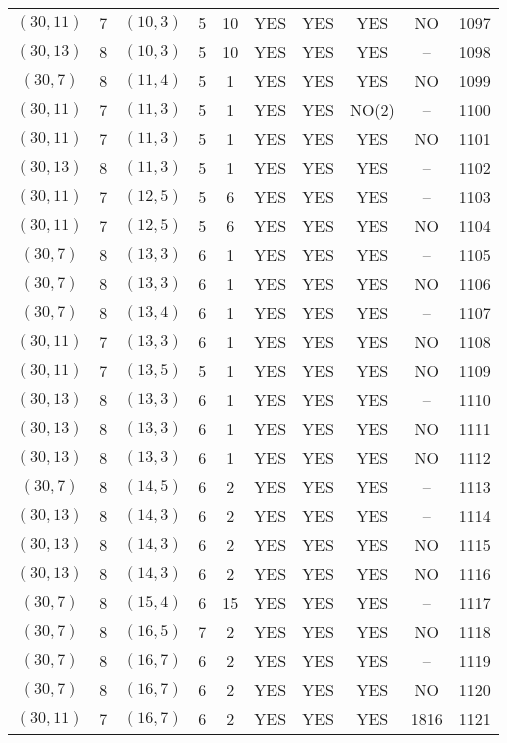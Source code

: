 \begin{longtable}{|c|c|c|c|c|c|c|c|c|c|}
$(30, 11)$ & 7 & $(10, 3)$ & 5 & 10 & YES & YES & YES & NO & 1097\\
$(30, 13)$ & 8 & $(10, 3)$ & 5 & 10 & YES & YES & YES & -- & 1098\\
$(30, 7)$ & 8 & $(11, 4)$ & 5 & 1 & YES & YES & YES & NO & 1099\\
$(30, 11)$ & 7 & $(11, 3)$ & 5 & 1 & YES & YES & NO(2) & -- & 1100\\
$(30, 11)$ & 7 & $(11, 3)$ & 5 & 1 & YES & YES & YES & NO & 1101\\
$(30, 13)$ & 8 & $(11, 3)$ & 5 & 1 & YES & YES & YES & -- & 1102\\
$(30, 11)$ & 7 & $(12, 5)$ & 5 & 6 & YES & YES & YES & -- & 1103\\
$(30, 11)$ & 7 & $(12, 5)$ & 5 & 6 & YES & YES & YES & NO & 1104\\
$(30, 7)$ & 8 & $(13, 3)$ & 6 & 1 & YES & YES & YES & -- & 1105\\
$(30, 7)$ & 8 & $(13, 3)$ & 6 & 1 & YES & YES & YES & NO & 1106\\
$(30, 7)$ & 8 & $(13, 4)$ & 6 & 1 & YES & YES & YES & -- & 1107\\
$(30, 11)$ & 7 & $(13, 3)$ & 6 & 1 & YES & YES & YES & NO & 1108\\
$(30, 11)$ & 7 & $(13, 5)$ & 5 & 1 & YES & YES & YES & NO & 1109\\
$(30, 13)$ & 8 & $(13, 3)$ & 6 & 1 & YES & YES & YES & -- & 1110\\
$(30, 13)$ & 8 & $(13, 3)$ & 6 & 1 & YES & YES & YES & NO & 1111\\
$(30, 13)$ & 8 & $(13, 3)$ & 6 & 1 & YES & YES & YES & NO & 1112\\
$(30, 7)$ & 8 & $(14, 5)$ & 6 & 2 & YES & YES & YES & -- & 1113\\
$(30, 13)$ & 8 & $(14, 3)$ & 6 & 2 & YES & YES & YES & -- & 1114\\
$(30, 13)$ & 8 & $(14, 3)$ & 6 & 2 & YES & YES & YES & NO & 1115\\
$(30, 13)$ & 8 & $(14, 3)$ & 6 & 2 & YES & YES & YES & NO & 1116\\
$(30, 7)$ & 8 & $(15, 4)$ & 6 & 15 & YES & YES & YES & -- & 1117\\
$(30, 7)$ & 8 & $(16, 5)$ & 7 & 2 & YES & YES & YES & NO & 1118\\
$(30, 7)$ & 8 & $(16, 7)$ & 6 & 2 & YES & YES & YES & -- & 1119\\
$(30, 7)$ & 8 & $(16, 7)$ & 6 & 2 & YES & YES & YES & NO & 1120\\
$(30, 11)$ & 7 & $(16, 7)$ & 6 & 2 & YES & YES & YES & 1816 & 1121\\

\end{longtable}
